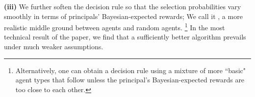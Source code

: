 \textbf{(iii)} We further soften the decision rule so that the selection probabilities vary smoothly in terms of principals' Bayesian-expected rewards;
We call it \SoftMaxRandom, a more realistic middle ground between \HardMax agents and random agents.%
\footnote{Alternatively, one can obtain a \SoftMaxRandom decision rule using a mixture of more ``basic" agent types that follow \HardMax unless the principal's Bayesian-expected rewards are too close to each other.}
In the most technical result of the paper, we find that a sufficiently better algorithm prevails under much weaker assumptions.





%


